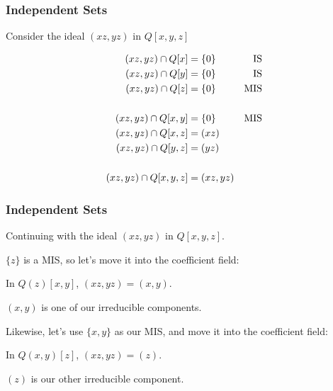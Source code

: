 \documentclass[11pt]{beamer}
\begin{document}
\begin{frame}
\frametitle{Independent Sets}
\begin{example}
Consider the ideal $(xz,yz)$ in $Q[x,y,z]$

\begin{align*}
(xz,yz) \cap Q[x] &= \{0\} &{\rm IS} \\
(xz,yz) \cap Q[y] &= \{0\} &{\rm IS} \\
(xz,yz) \cap Q[z] &= \{0\} &{\rm MIS} \\
\\
(xz,yz) \cap Q[x,y] &= \{0\} &{\rm MIS} \\
(xz,yz) \cap Q[x,z] &= (xz) \\
(xz,yz) \cap Q[y,z] &= (yz) \\
\\
(xz,yz) \cap Q[x,y,z] &= (xz,yz) \\
\end{align*}
\end{example}

\end{frame}

\begin{frame}
\frametitle{Independent Sets}
\begin{example}[cont]
Continuing with the ideal $(xz,yz)$ in $Q[x,y,z]$.

\vskip 12pt

$\{z\}$ is a MIS, so let's move it into the coefficient field:

\vskip 12pt

In $Q(z)[x,y]$, $(xz,yz) = (x,y)$.

\vskip 12pt

$(x,y)$ is one of our irreducible components.

\vskip 12pt

Likewise, let's use $\{x,y\}$ as our MIS, and move it into the coefficient field:

\vskip 12pt

In $Q(x,y)[z]$, $(xz,yz) = (z)$.

\vskip 12pt

$(z)$ is our other irreducible component.

\end{example}

\end{frame}
\end{document}
